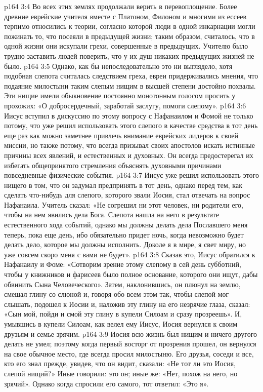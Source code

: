 \vs p164 3:4 Во всех этих землях продолжали верить в перевоплощение. Более древние еврейские учителя вместе с Платоном, Филоном и многими из ессеев терпимо относились к теории, согласно которой люди в одной инкарнации могли пожинать то, что посеяли в предыдущей жизни; таким образом, считалось, что в одной жизни они искупали грехи, совершенные в предыдущих. Учителю было трудно заставить людей поверить, что у их душ никаких предыдущих жизней не было.
\vs p164 3:5 Однако, как бы непоследовательно это ни выглядело, хотя подобная слепота считалась следствием греха, евреи придерживались мнения, что подаяние милостыни таким слепым нищим в высшей степени достойно похвалы. Эти нищие имели обыкновение постоянно монотонным голосом просить у прохожих: «О добросердечный, заработай заслугу, помоги слепому».
\vs p164 3:6 \pc Иисус вступил в дискуссию по этому вопросу с Нафанаилом и Фомой не только потому, что уже решил использовать этого слепого в качестве средства в тот день еще раз как можно заметнее привлечь внимание еврейских лидеров к своей миссии, но также потому, что всегда призывал своих апостолов искать истинные причины всех явлений, и естественных и духовных. Он всегда предостерегал их избегать общепринятого стремления объяснять духовными причинами повседневные физические события.
\vs p164 3:7 Иисус уже решил использовать этого нищего в том, что он задумал предпринять в тот день, однако перед тем, как сделать что\hyp{}нибудь для слепого, которого звали Иосия, стал отвечать на вопрос Нафанаила. Учитель сказал: «Не согрешил ни этот человек, ни родители его, чтобы на нем явились дела Бога. Слепота нашла на него в результате естественного хода событий, однако мы должны делать дела Пославшего меня теперь, пока еще день, ибо обязательно придет ночь, когда невозможно будет делать дело, которое мы должны исполнить. Доколе я в мире, я свет миру, но уже совсем скоро меня с вами не будет».
\vs p164 3:8 Сказав это, Иисус обратился к Нафанаилу и Фоме: «Сотворим зрение этому слепому в сей день субботний, чтобы у книжников и фарисеев было полное основание, которого они ищут, дабы обвинить Сына Человеческого». Затем, наклонившись, он плюнул на землю, смешал глину со слюной и, говоря обо всем этом так, чтобы слепой мог слышать, подошел к Иосии и, наложив эту глину на его незрячие глаза, сказал: «Сын мой, пойди и смой эту глину в купели Силоам и сразу прозреешь». И, умывшись в купели Силоам, как велел ему Иисус, Иосия вернулся к своим друзьям и семье зрячим.
\vs p164 3:9 Иосия всю жизнь был нищим и ничего другого делать не умел; поэтому когда первый восторг от прозрения прошел, он вернулся на свое обычное место, где всегда просил милостыню. Его друзья, соседи и все, кто его знал прежде, увидев, что он видит, сказали: «Не тот ли это Иосия, слепой нищий?» Иные говорили: это он; иные же: «Нет, похож на него, но зрячий». Однако когда спросили его самого, тот ответил: «Это я».
